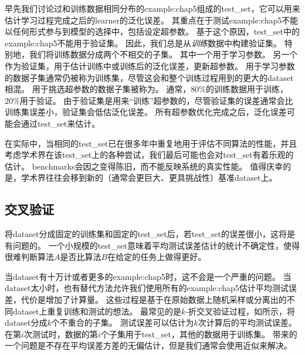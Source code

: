 早先我们讨论过和训练数据相同分布的\gls{example:chap5}组成的\gls{test_set}，它可以用来估计学习过程完成之后的\gls{learner}的泛化误差。
其重点在于测试\gls{example:chap5}不能以任何形式参与到模型的选择中，包括设定超参数。
基于这个原因，\gls{test_set}中的\gls{example:chap5}不能用于验证集。
因此，我们总是从\emph{训练}数据中构建验证集。
特别地，我们将训练数据分成两个不相交的子集。
其中一个用于学习参数。
另一个作为验证集，用于估计训练中或训练后的泛化误差，更新超参数。
用于学习参数的数据子集通常仍被称为训练集，尽管这会和整个训练过程用到的更大的\gls{dataset}相混。
用于挑选超参数的数据子集被称为。
通常，$80\%$的训练数据用于训练，$20\%$用于验证。
由于验证集是用来``训练''超参数的，尽管验证集的误差通常会比训练集误差小，验证集会低估泛化误差。
所有超参数优化完成之后，泛化误差可能会通过\gls{test_set}来估计。

在实际中，当相同的\gls{test_set}已在很多年中重复地用于评估不同算法的性能，并且考虑学术界在该\gls{test_set}上的各种尝试，我们最后可能也会对\gls{test_set}有着乐观的估计。
\gls{benchmarks}会因之变得陈旧，而不能反映系统的真实性能。
值得庆幸的是，学术界往往会移到新的（通常会更巨大、更具挑战性）基准\gls{dataset}上。

\subsection{交叉验证}
\label{sec:cross_validation}
将\gls{dataset}分成固定的训练集和固定的\gls{test_set}后，若\gls{test_set}的误差很小，这将是有问题的。
一个小规模的\gls{test_set}意味着平均测试误差估计的统计不确定性，使得很难判断算法$A$是否比算法$B$在给定的任务上做得更好。


当\gls{dataset}有十万计或者更多的\gls{example:chap5}时，这不会是一个严重的问题。
当\gls{dataset}太小时，也有替代方法允许我们使用所有的\gls{example:chap5}估计平均测试误差，代价是增加了计算量。
这些过程是基于在原始数据上随机采样或分离出的不同\gls{dataset}上重复训练和测试的想法。
最常见的是$k$-折交叉验证过程，如所示，将\gls{dataset}分成$k$个不重合的子集。
测试误差可以估计为$k$次计算后的平均测试误差。
在第$i$次测试时，数据的第$i$个子集用于\gls{test_set}，其他的数据用于训练集。
带来的一个问题是不存在平均误差方差的无偏估计\citep{Bengio-Grandvalet-JMLR-04}，但是我们通常会使用近似来解决。

